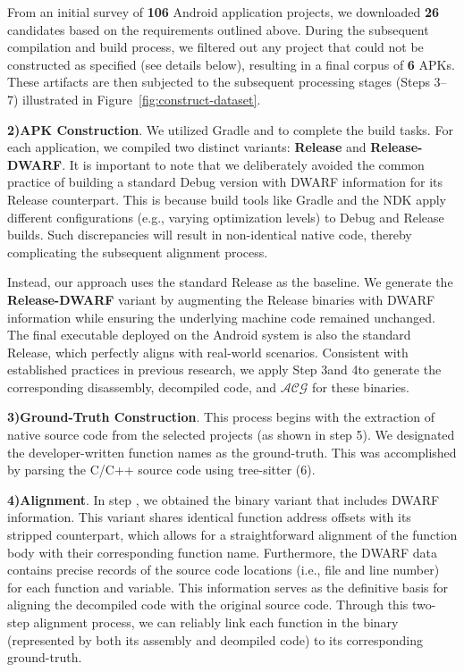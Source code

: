 \documentclass[acmsmall,screen,review,anonymous]{acmart} %
\begin{document}
From an initial survey of \textbf{106} Android application projects, we downloaded \textbf{26} candidates based on the requirements outlined above. During the subsequent compilation and build process, we filtered out any project that could not be constructed as specified (see details below), resulting in a final corpus of \textbf{6} APKs. These artifacts are then subjected to the subsequent processing stages (Steps \normalsize{\textcircled{\scriptsize{3}}}\normalsize–\normalsize{\textcircled{\scriptsize{7}}}\normalsize) illustrated in Figure~\ref{fig:construct-dataset}.


\textbf{2)APK Construction}. We utilized Gradle\cite{Gradle} and \cite{CMake} to complete the build tasks. For each application, we compiled two distinct variants: \textbf{Release} and \textbf{Release-DWARF}. It is important to note that we deliberately avoided the common practice of building a standard Debug version with DWARF information for its Release counterpart. This is because build tools like Gradle and the NDK\cite{NDK} apply different configurations (e.g., varying optimization levels) to Debug and Release builds. Such discrepancies will result in non-identical native code, thereby complicating the subsequent alignment process.

Instead, our approach uses the standard Release as the baseline. We generate the \textbf{Release-DWARF} variant by augmenting the Release binaries with DWARF information while ensuring the underlying machine code remained unchanged. The final executable deployed on the Android system is also the standard Release, which perfectly aligns with real-world scenarios. Consistent with established practices in previous research, we apply Step \normalsize{\textcircled{\scriptsize{3}}}\normalsize and  \normalsize{\textcircled{\scriptsize{4}}}\normalsize to generate the corresponding disassembly, decompiled code, and $\mathcal{ACG}$ for these binaries.


\textbf{3)Ground-Truth Construction}. This process begins with the extraction of native source code from the selected projects (as shown in step \normalsize{\textcircled{\scriptsize{5}}}\normalsize). We designated the developer-written function names as the ground-truth. This was accomplished by parsing the C/C++ source code using tree-sitter\cite{tree_sitter} (\normalsize{\textcircled{\scriptsize{6}}}\normalsize).

\textbf{4)Alignment}. In step , we obtained the binary variant that includes DWARF information. This variant shares identical function address offsets with its stripped counterpart, which allows for a straightforward alignment of the function body with their corresponding function name. Furthermore, the DWARF data contains precise records of the source code locations (i.e., file and line number) for each function and variable. This information serves as the definitive basis for aligning the decompiled code with the original source code. Through this two-step alignment process, we can reliably link each function in the binary (represented by both its assembly and deompiled code) to its corresponding ground-truth.
\end{document}
